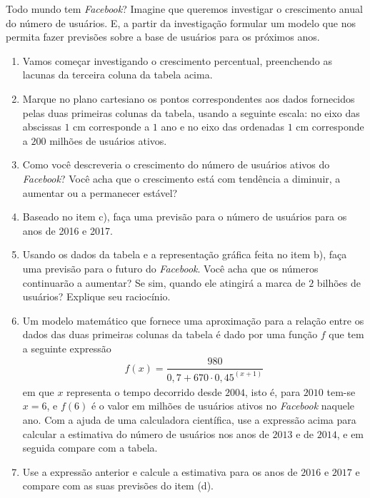 \begin{task}{ Todo mundo tem \emph{Facebook}?}
Imagine que queremos investigar o crescimento anual do número de usuários. E, a partir da investigação formular um modelo que nos permita fazer previsões sobre a base de usuários para os próximos anos.
\begin{enumerate}
\item {} 
Vamos começar investigando o crescimento percentual, preenchendo as lacunas da terceira coluna da tabela acima.

\item {} 
Marque no plano cartesiano os pontos correspondentes aos dados fornecidos pelas duas primeiras colunas da tabela, usando a seguinte escala: no eixo das abscissas \(1\) cm corresponde a \(1\) ano e no eixo das ordenadas \(1\) cm corresponde a \(200\) milhões de usuários ativos.

\item {} 
Como você descreveria o crescimento do número de usuários ativos do \emph{Facebook}? Você acha que o crescimento está com tendência a diminuir, a aumentar ou a permanecer estável?

\item {} 
Baseado no item c), faça uma previsão para o número de usuários para os anos de 2016 e 2017.

\item {} 
Usando os dados da tabela e a representação gráfica feita no item b), faça uma previsão para o futuro do \emph{Facebook}. Você acha que os números continuarão a aumentar? Se sim, quando ele atingirá a marca de \(2\) bilhões de usuários? Explique seu raciocínio.

\item {} 
Um modelo matemático que fornece uma aproximação para a relação entre os dados das duas primeiras colunas da tabela é dado por uma função \(f\) que tem a seguinte expressão
\begin{equation*}
\begin{split}f(x)=\dfrac{980}{0,7+670 \cdot 0,45^{(x+1)}}\end{split}
\end{equation*}
em que \(x\) representa o tempo decorrido desde \(2004\), isto é, para \(2010\) tem-se \(x=6\), e \(f(6)\) é o valor em milhões de usuários ativos no \emph{Facebook} naquele ano. Com a ajuda de uma calculadora científica, use a expressão acima para calcular a estimativa do número de usuários nos anos de \(2013\) e de \(2014\), e em seguida compare com a tabela.

\item {} 
Use a expressão anterior e calcule a estimativa para os anos de \(2016\) e \(2017\) e compare com as suas previsões do item (d).


\end{enumerate}
\end{task}
